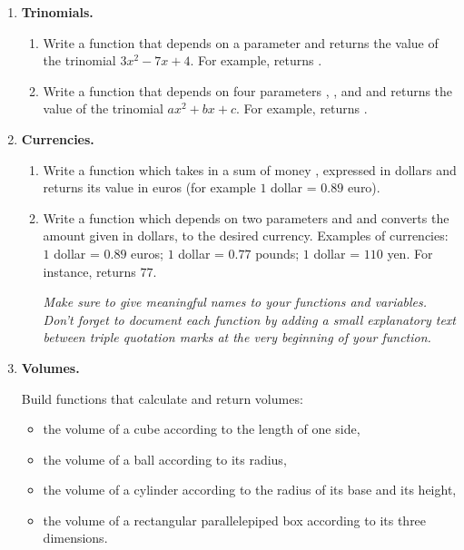 \documentclass[11pt,class=report,crop=false]{standalone}
\begin{document}
\begin{activite}


\begin{enumerate}
  \item \textbf{Trinomials.}
  
  \begin{enumerate}
    \item Write a function  that depends on a parameter  and returns the value of the trinomial $3x^2-7x+4$. For example,  returns .
    
    \item Write a function  that depends on four parameters , ,  and  and returns the value of the trinomial $ax^2+bx+c$. For example,  returns .
  \end{enumerate}   
  
  
  \item \textbf{Currencies.}
  
   \begin{enumerate}
    \item Write a function  which takes in a sum of money , expressed in dollars and returns its value in euros (for example $1$ dollar = $0.89$ euro).
    
    \item Write a function  which depends on two parameters  and  and converts the amount given in dollars, to the desired currency.
    Examples of currencies: 
    $1$ dollar = $0.89$ euros;
    $1$ dollar = $0.77$ pounds;
    $1$ dollar = $110$ yen.
    For instance,  returns $77$.   
    
    
  \emph{Make sure to give meaningful names to your functions and variables. Don't forget to document each function by adding a small explanatory text between triple quotation marks at the very beginning of your function.}
    
    
  \end{enumerate}   
  
  \item \textbf{Volumes.}
  
   Build functions that calculate and return volumes:
  \begin{itemize}
    \item the volume of a cube according to the length of one side,
    \item the volume of a ball according to its radius,
    \item the volume of a cylinder according to the radius of its base and its height,
    \item the volume of a rectangular parallelepiped box according to its three dimensions.
   \end{itemize}
   

\end{enumerate}
\end{activite}
\end{document}
